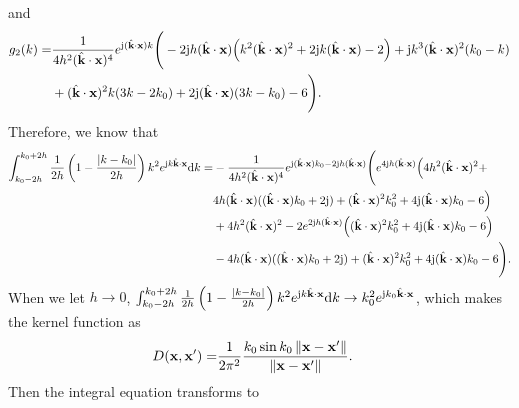 \documentclass[12pt,draftclsnofoot,journal,onecolumn]{IEEEtran}
\begin{document}
     and
    \begin{equation}
    	\begin{aligned}
    		g_2(k) =& \frac{1}{4 h^2 (\hat{\bf k}\cdot {\bf x})^4}e^{{\rm j} (\hat{\bf k}\cdot {\bf x}) k} \Bigg(-2 {\rm j} h (\hat{\bf k}\cdot {\bf x}) \Big(k^2 (\hat{\bf k}\cdot {\bf x})^2+2 {\rm j} k (\hat{\bf k}\cdot {\bf x})-2\Big)+{\rm j} k^3 (\hat{\bf k}\cdot {\bf x})^2 (k_0-k)\\&+(\hat{\bf k}\cdot {\bf x})^2 k (3 k-2 k_0)+2 {\rm j} (\hat{\bf k}\cdot {\bf x}) (3 k-k_0)-6\Bigg).
    	\end{aligned}
    \end{equation} 
    Therefore, we know that 
    \begin{equation}
    	\begin{aligned}
    		\int_{k_0-2h}^{k_0+2h} \frac{1}{2h}\left( 1-\frac{|k-k_0|}{2h} \right)k^2e^{{\rm j}k\hat{\bf k}\cdot {\bf x}}{\rm d}k
    		=& -\frac{1}{4 h^2 (\hat{\bf k}\cdot {\bf x})^4}e^{{\rm j} (\hat{\bf k}\cdot {\bf x}) k_0-2 {\rm j} h (\hat{\bf k}\cdot {\bf x})} 
    		\Bigg(e^{4 {\rm j} h (\hat{\bf k}\cdot {\bf x})} \Big(4 h^2 (\hat{\bf k}\cdot {\bf x})^2+\\&4 h (\hat{\bf k}\cdot {\bf x}) ((\hat{\bf k}\cdot {\bf x}) k_0+2 {\rm j})+(\hat{\bf k}\cdot {\bf x})^2 k_0^2+4 {\rm j} (\hat{\bf k}\cdot {\bf x}) k_0-6\Big)
    		\\&+4 h^2 (\hat{\bf k}\cdot {\bf x})^2-2 e^{2 {\rm j} h (\hat{\bf k}\cdot {\bf x})} \Big((\hat{\bf k}\cdot {\bf x})^2 k_0^2+4 {\rm j} (\hat{\bf k}\cdot {\bf x}) k_0-6\Big)\\&-4 h (\hat{\bf k}\cdot {\bf x}) ((\hat{\bf k}\cdot {\bf x}) k_0+2 {\rm j})+(\hat{\bf k}\cdot {\bf x})^2 k_0^2+4 {\rm j} (\hat{\bf k}\cdot {\bf x}) k_0-6\Bigg).
    	\end{aligned}
    \end{equation}
    When we let $h\rightarrow 0$, $\int_{k_0-2h}^{k_0+2h} \frac{1}{2h}\left( 1-\frac{|k-k_0|}{2h} \right)k^2e^{{\rm j}k\hat{\bf k}\cdot {\bf x}}{\rm d}k \rightarrow k_0^2 e^{{\rm j}k_0 \hat{\bf k}\cdot {\bf x}}$, which makes the kernel function as 
    \begin{equation}
    	\begin{aligned}
    		D({\bf x},{\bf x}') =&  \frac{1}{2\pi^2} \frac{k_0\sin k_0 \left\| {\bf x}-{\bf x}' \right\|}{\left\|  {\bf x}-{\bf x}' \right\|}.
    	\end{aligned}
		\label{eqn_spherical_surface}
    \end{equation}
    Then the integral equation transforms to
\end{document}
